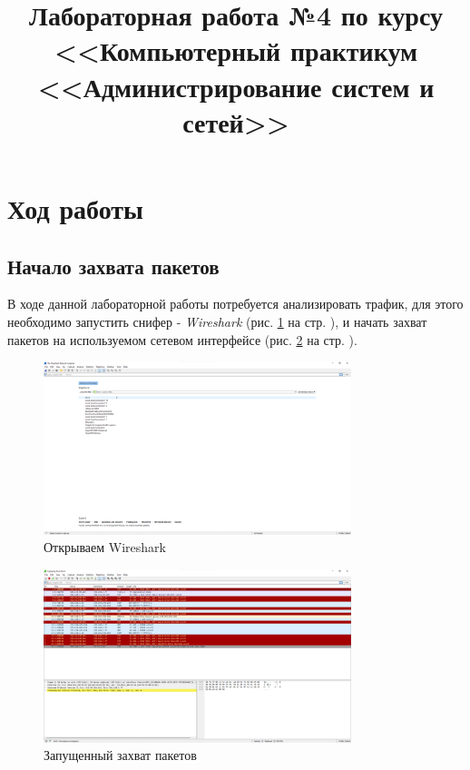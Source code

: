 \documentclass[a4paper]{article}
\title{
  Лабораторная работа №4 по курсу \\
  <<Компьютерный практикум <<Администрирование систем и сетей>>  
}
\begin{document}
  \templatedtitlepage
  
  \toc
  \section{Ход работы}

  \subsection{Начало захвата пакетов}

  В ходе данной лабораторной работы потребуется анализировать
  трафик, для этого необходимо запустить снифер - \textit{Wireshark} (рис. \ref{img:0001} на стр. \pageref{img:0001}),
  и начать захват пакетов на используемом сетевом интерфейсе (рис. \ref{img:0002} на стр. \pageref{img:0002}).

  \begin{figure}[H]
    \centering
    \includegraphics[width=0.8\textwidth]{04_00 (1)}
    \caption{Открываем Wireshark}
    \label{img:0001}
  \end{figure}
  
  \begin{figure}[H]
    \centering
    \includegraphics[width=0.8\textwidth]{04_00 (2)}
    \caption{Запущенный захват пакетов}
    \label{img:0002}
  \end{figure}
\end{document}
